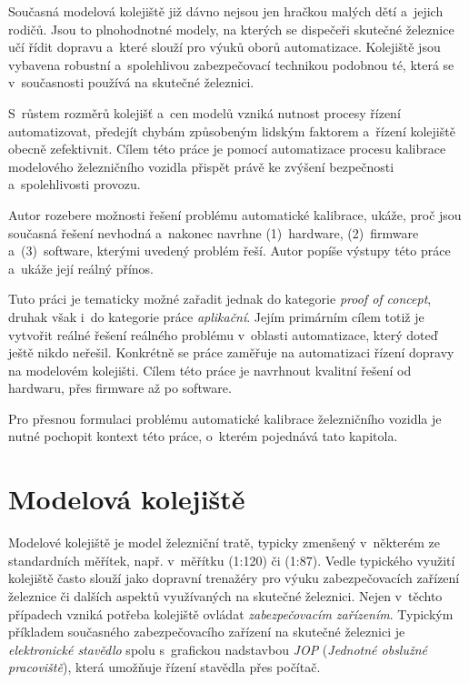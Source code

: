 Současná modelová kolejiště již dávno nejsou jen hračkou malých dětí
a~jejich rodičů. Jsou to plnohodnotné modely, na kterých se dispečeři skutečné
železnice učí řídit dopravu a~které slouží pro výuků oborů automatizace.
Kolejiště jsou vybavena robustní a~spolehlivou zabezpečovací technikou
podobnou té, která se v~současnosti používá na skutečné železnici.

S~růstem rozměrů kolejišť a~cen modelů vzniká nutnost procesy řízení
automatizovat, předejít chybám způsobeným lidským faktorem a~řízení kolejiště
obecně zefektivnit. Cílem této práce je pomocí automatizace procesu kalibrace
modelového železničního vozidla přispět právě ke zvýšení bezpečnosti
a~spolehlivosti provozu.

Autor rozebere možnosti řešení problému automatické kalibrace, uká\-že, proč
jsou současná řešení nevhodná a~nakonec navrhne (1)~hardware, (2)~firmware
a~(3)~software, kterými uvedený problém řeší. Autor popíše výstupy této práce
a~ukáže její reálný přínos.

Tuto práci je tematicky možné zařadit jednak do kategorie \textit{proof of
concept}, druhak však i~do kategorie práce \textit{aplikační}. Jejím primárním
cílem totiž je vytvořit reálné řešení reálného problému v~oblasti automatizace,
který doteď ještě nikdo neřešil. Konkrétně se práce zaměřuje na automatizaci
řízení dopravy na modelovém kolejišti. Cílem této práce je navrhnout kvalitní
řešení od hardwaru, přes firmware až po software.

Pro přesnou formulaci problému automatické kalibrace železničního vozidla je
nutné pochopit kontext této práce, o~kterém pojednává tato kapitola.

\section{Modelová kolejiště}
\label{sec:mod-kol}

Modelové kolejiště je model železniční tratě, typicky zmenšený
v~některém ze standardních měřítek, např. v~měřítku  (1:120) či 
(1:87). Vedle typického  využití kolejiště často slouží jako dopravní
trenažéry pro výuku zabezpečovacích zařízení železnice či dalších aspektů
využívaných na skutečné železnici. Nejen v~těchto případech vzniká potřeba
kolejiště ovládat \textit{zabezpečovacím zařízením}. Typickým příkladem
současného zabezpečovacího zařízení na skutečné železnici je
\textit{elektronické stavědlo} spolu s~grafickou nadstavbou
\textit{\gls{JOP}} (\textit{Jednotné obslužné pracoviště}), která umožňuje řízení
stavědla přes počítač.

